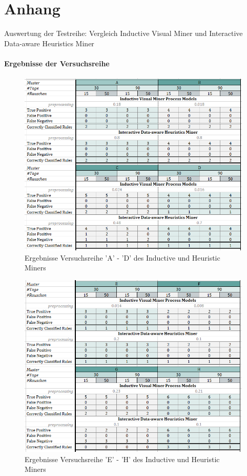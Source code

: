 \chapter*{Anhang}
Auswertung der Testreihe: Vergleich Inductive Visual Miner und Interactive Data-aware Heuristics Miner
\captionsetup[table]{list=no}
\captionsetup[figure]{list=no}
\subsubsection{Ergebnisse der Versuchsreihe}\label{results}
\begin{figure}[!ht]
    \centering
    \includegraphics[width=\textwidth]{figures/Appbildungen/tab1.PNG}
    \caption{Ergebnisse Versuchsreihe 'A' - 'D' des Inductive und Heuristic Miners}
    \label{tab1}
\end{figure}

\begin{figure}[!ht]
    \centering
    \includegraphics[width=\textwidth]{figures/Appbildungen/tab2.PNG}
    \caption{Ergebnisse Versuchsreihe 'E' - 'H' des Inductive und Heuristic Miners}
    \label{tab2}
\end{figure}

